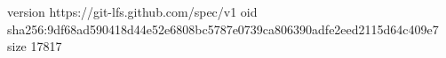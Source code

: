 version https://git-lfs.github.com/spec/v1
oid sha256:9df68ad590418d44e52e6808bc5787e0739ca806390adfe2eed2115d64c409e7
size 17817
